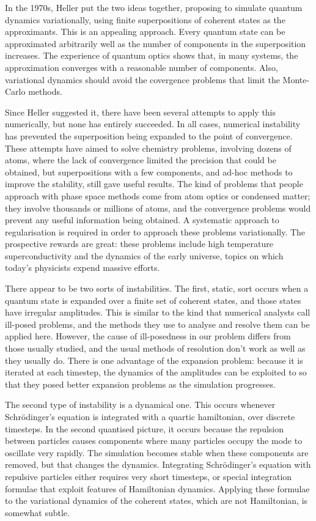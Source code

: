 In the 1970s, Heller put the two ideas together, proposing to simulate quantum dynamics variationally, using finite superpositions of coherent states as the approximants.  This is an appealing approach.  Every quantum state can be approximated arbitrarily well as the number of components in the superposition increases.  The experience of quantum optics shows that, in many systems, the approximation converges with a reasonable number of components.  Also, variational dynamics should avoid the covergence problems that limit the Monte-Carlo methods.


Since Heller suggested it, there have been several attempts to apply this numerically, but none has entirely succeeded.  In all cases, numerical instability has prevented the superposition being expanded to the point of convergence.
These attempts have aimed to solve chemistry problems, involving dozens of atoms, where the lack of convergence limited the precision that could be obtained, but superpositions with a few components, and ad-hoc methods to improve the stability, still gave useful results.  The kind of problems that people approach with phase space methods come from atom optics or condensed matter; they involve thousands or millions of atoms, and the convergence problems would prevent any useful information being obtained.  A systematic approach to regularisation is required in order to approach these problems variationally.  The prospective rewards are great: these problems include high temperature superconductivity and the dynamics of the early universe, topics on which today's physicists expend massive efforts.


There appear to be two sorts of instabilities.  The first, static, sort occurs when a quantum state is expanded over a finite set of coherent states, and those states have irregular amplitudes.  This is similar to the kind that numerical analysts call ill-posed problems, and the methods they use to analyse and resolve them can be applied here.  However, the cause of ill-posedness in our problem differs from those usually studied, and the usual methods of resolution don't work as well as they usually do.  There is one advantage of the expansion problem: because it is iterated at each timestep, the dynamics of the amplitudes can be exploited to so that they posed better expansion problems as the simulation progresses.

The second type of instability is a dynamical one.  This occurs whenever Schrödinger's equation is integrated with a quartic hamiltonian, over discrete timesteps.  In the second quantised picture, it occurs because the repulsion between particles causes components where many particles occupy the mode to oscillate very rapidly.  The simulation becomes stable when these components are removed, but that changes the dynamics.  Integrating Schrödinger's equation with repulsive particles either requires very short timesteps, or special integration formulae that exploit features of Hamiltonian dynamics.  Applying these formulae to the variational dynamics of the coherent states, which are not Hamiltonian, is somewhat subtle.

